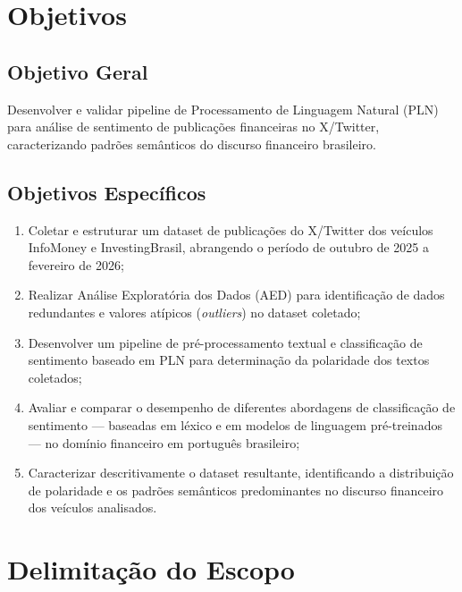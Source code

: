 \section{Objetivos}\label{sec:objetivos}

\subsection{Objetivo Geral}

Desenvolver e validar pipeline de Processamento de Linguagem Natural (PLN) para análise de sentimento de publicações financeiras no X/Twitter, caracterizando padrões semânticos do discurso financeiro brasileiro.

\subsection{Objetivos Específicos}

\begin{enumerate}
	\item Coletar e estruturar um dataset de publicações do X/Twitter dos veículos InfoMoney e InvestingBrasil, abrangendo o período de outubro de 2025 a fevereiro de 2026;
	
	\item Realizar Análise Exploratória dos Dados (AED) para identificação de dados redundantes e valores atípicos (\textit{outliers}) no dataset coletado;
	
	\item Desenvolver um pipeline de pré-processamento textual e classificação de sentimento baseado em PLN para determinação da polaridade dos textos coletados;
	
	\item Avaliar e comparar o desempenho de diferentes abordagens de classificação de sentimento --- baseadas em léxico e em modelos de linguagem pré-treinados --- no domínio financeiro em português brasileiro;
	
	\item Caracterizar descritivamente o dataset resultante, identificando a distribuição de polaridade e os padrões semânticos predominantes no discurso financeiro dos veículos analisados.
	
\end{enumerate}


\section{Delimitação do Escopo}

